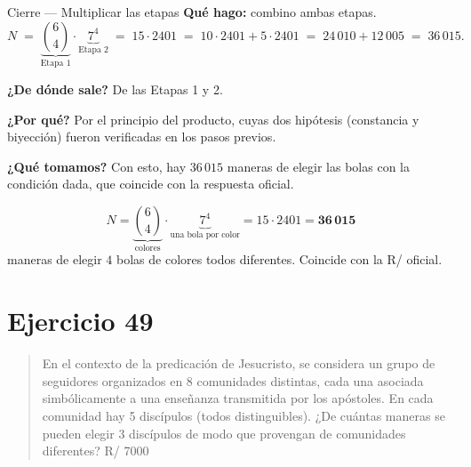 \documentclass[11pt]{article}
\begin{document}
\begin{paso}{Cierre --- Multiplicar las etapas}
\textbf{Qu\'e hago:} combino ambas etapas.
\[
N\;=\;\underbrace{\binom{6}{4}}_{\text{Etapa 1}}\cdot\underbrace{7^4}_{\text{Etapa 2}}
\;=\;15\cdot 2401\;=\;10\cdot 2401+5\cdot 2401\;=\;24\,010+12\,005\;=\;36\,015 .
\]

\textbf{¿De d\'onde sale?} De las Etapas 1 y 2.

\textbf{¿Por qu\'e?} Por el principio del producto, cuyas dos hip\'otesis (constancia y biyecci\'on) fueron
verificadas en los pasos previos.

\textbf{¿Qu\'e tomamos?} Con esto, hay $36\,015$ maneras de elegir las bolas con la condici\'on dada, que
coincide con la respuesta oficial.
\end{paso}

\begin{resp}
\[
N=\underbrace{\binom{6}{4}}_{\text{colores}}\cdot\underbrace{7^4}_{\text{una bola por color}}=15\cdot 2401=\mathbf{36\,015}
\]
maneras de elegir $4$ bolas de colores todos diferentes. Coincide con la R/ oficial.
\end{resp}

\section*{Ejercicio 49}

\begin{quote}
En el contexto de la predicaci\'on de Jesucristo, se considera un grupo de seguidores organizados en 8
comunidades distintas, cada una asociada simb\'olicamente a una ense\~nanza transmitida por los ap\'ostoles.
En cada comunidad hay 5 disc\'ipulos (todos distinguibles). ¿De cu\'antas maneras se pueden elegir 3
disc\'ipulos de modo que provengan de comunidades diferentes? \hfill R/ 7000
\end{quote}
\end{document}
